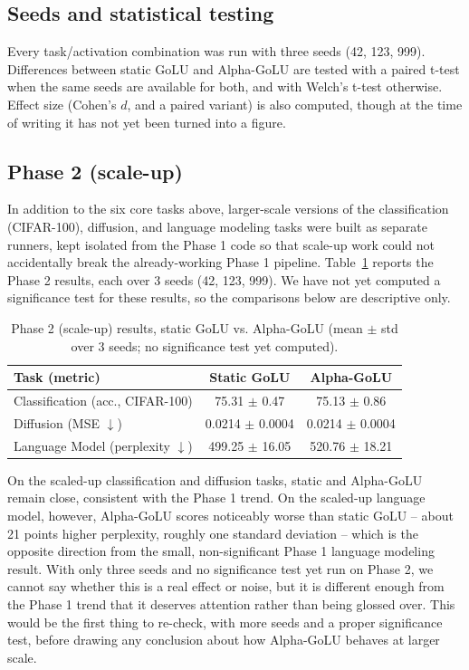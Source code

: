 \documentclass[conference]{IEEEtran}
\begin{document}
\subsection{Seeds and statistical testing}

Every task/activation combination was run with three seeds (42, 123, 999). Differences between static GoLU and Alpha-GoLU are tested with a paired t-test when the same seeds are available for both, and with Welch's t-test otherwise. Effect size (Cohen's $d$, and a paired variant) is also computed, though at the time of writing it has not yet been turned into a figure.

\subsection{Phase 2 (scale-up)}

In addition to the six core tasks above, larger-scale versions of the classification (CIFAR-100), diffusion, and language modeling tasks were built as separate runners, kept isolated from the Phase 1 code so that scale-up work could not accidentally break the already-working Phase 1 pipeline. Table~\ref{tab:phase2} reports the Phase 2 results, each over 3 seeds (42, 123, 999). We have not yet computed a significance test for these results, so the comparisons below are descriptive only.

\begin{table}[h]
\centering
\caption{Phase 2 (scale-up) results, static GoLU vs. Alpha-GoLU (mean $\pm$ std over 3 seeds; no significance test yet computed).}
\label{tab:phase2}
\begin{tabular}{@{}lcc@{}}
\toprule
Task (metric) & Static GoLU & Alpha-GoLU \\
\midrule
Classification (acc., CIFAR-100) & 75.31 $\pm$ 0.47 & 75.13 $\pm$ 0.86 \\
Diffusion (MSE $\downarrow$) & 0.0214 $\pm$ 0.0004 & 0.0214 $\pm$ 0.0004 \\
Language Model (perplexity $\downarrow$) & 499.25 $\pm$ 16.05 & 520.76 $\pm$ 18.21 \\
\bottomrule
\end{tabular}
\end{table}

On the scaled-up classification and diffusion tasks, static and Alpha-GoLU remain close, consistent with the Phase 1 trend. On the scaled-up language model, however, Alpha-GoLU scores noticeably worse than static GoLU -- about 21 points higher perplexity, roughly one standard deviation -- which is the opposite direction from the small, non-significant Phase 1 language modeling result. With only three seeds and no significance test yet run on Phase 2, we cannot say whether this is a real effect or noise, but it is different enough from the Phase 1 trend that it deserves attention rather than being glossed over. This would be the first thing to re-check, with more seeds and a proper significance test, before drawing any conclusion about how Alpha-GoLU behaves at larger scale.
\end{document}
